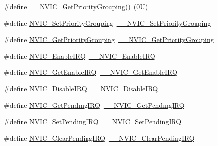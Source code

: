 \begin{DoxyCompactItemize}
\#define \hyperlink{group___c_m_s_i_s___core___n_v_i_c_functions_gab2072fe50f6d7cd208f6768919f59fae}{\+\_\+\+\_\+\+N\+V\+I\+C\+\_\+\+Get\+Priority\+Grouping}()~(0\+U)
\item 
\#define \hyperlink{group___c_m_s_i_s___core___n_v_i_c_functions_ga0e798d5aec68cdd8263db86a76df788f}{N\+V\+I\+C\+\_\+\+Set\+Priority\+Grouping}~\hyperlink{group___c_m_s_i_s___core___n_v_i_c_functions_gafc94dcbaee03e4746ade1f5bb9aaa56d}{\+\_\+\+\_\+\+N\+V\+I\+C\+\_\+\+Set\+Priority\+Grouping}
\item 
\#define \hyperlink{group___c_m_s_i_s___core___n_v_i_c_functions_ga4eeb9214f2264fc23c34ad5de2d3fa11}{N\+V\+I\+C\+\_\+\+Get\+Priority\+Grouping}~\hyperlink{group___c_m_s_i_s___core___n_v_i_c_functions_ga9b894af672df4373eb637f8288845c05}{\+\_\+\+\_\+\+N\+V\+I\+C\+\_\+\+Get\+Priority\+Grouping}
\item 
\#define \hyperlink{group___c_m_s_i_s___core___n_v_i_c_functions_ga57b3064413dbc7459d9646020fdd8bef}{N\+V\+I\+C\+\_\+\+Enable\+I\+RQ}~\hyperlink{group___c_m_s_i_s___core___n_v_i_c_functions_ga71227e1376cde11eda03fcb62f1b33ea}{\+\_\+\+\_\+\+N\+V\+I\+C\+\_\+\+Enable\+I\+RQ}
\item 
\#define \hyperlink{group___c_m_s_i_s___core___n_v_i_c_functions_ga857de13232ec65dd15087eaa15bc4a69}{N\+V\+I\+C\+\_\+\+Get\+Enable\+I\+RQ}~\hyperlink{group___c_m_s_i_s___core___n_v_i_c_functions_gaaeb5e7cc0eaad4e2817272e7bf742083}{\+\_\+\+\_\+\+N\+V\+I\+C\+\_\+\+Get\+Enable\+I\+RQ}
\item 
\#define \hyperlink{group___c_m_s_i_s___core___n_v_i_c_functions_ga73b4e251f59cab4e9a5e234aac02ae57}{N\+V\+I\+C\+\_\+\+Disable\+I\+RQ}~\hyperlink{group___c_m_s_i_s___core___n_v_i_c_functions_gae016e4c1986312044ee768806537d52f}{\+\_\+\+\_\+\+N\+V\+I\+C\+\_\+\+Disable\+I\+RQ}
\item 
\#define \hyperlink{group___c_m_s_i_s___core___n_v_i_c_functions_gac608957a239466e9e0cbc30aa64feb3b}{N\+V\+I\+C\+\_\+\+Get\+Pending\+I\+RQ}~\hyperlink{group___c_m_s_i_s___core___n_v_i_c_functions_ga5a92ca5fa801ad7adb92be7257ab9694}{\+\_\+\+\_\+\+N\+V\+I\+C\+\_\+\+Get\+Pending\+I\+RQ}
\item 
\#define \hyperlink{group___c_m_s_i_s___core___n_v_i_c_functions_ga2b47e2e52cf5c48a5c3348636434b3ac}{N\+V\+I\+C\+\_\+\+Set\+Pending\+I\+RQ}~\hyperlink{group___c_m_s_i_s___core___n_v_i_c_functions_gaabefdd4b790b9a7308929938c0c1e1ad}{\+\_\+\+\_\+\+N\+V\+I\+C\+\_\+\+Set\+Pending\+I\+RQ}
\item 
\#define \hyperlink{group___c_m_s_i_s___core___n_v_i_c_functions_ga590cf113000a079b1f0ea3dcd5b5316c}{N\+V\+I\+C\+\_\+\+Clear\+Pending\+I\+RQ}~\hyperlink{group___c_m_s_i_s___core___n_v_i_c_functions_ga562a86dbdf14827d0fee8fdafb04d191}{\+\_\+\+\_\+\+N\+V\+I\+C\+\_\+\+Clear\+Pending\+I\+RQ}

\end{DoxyCompactItemize}
